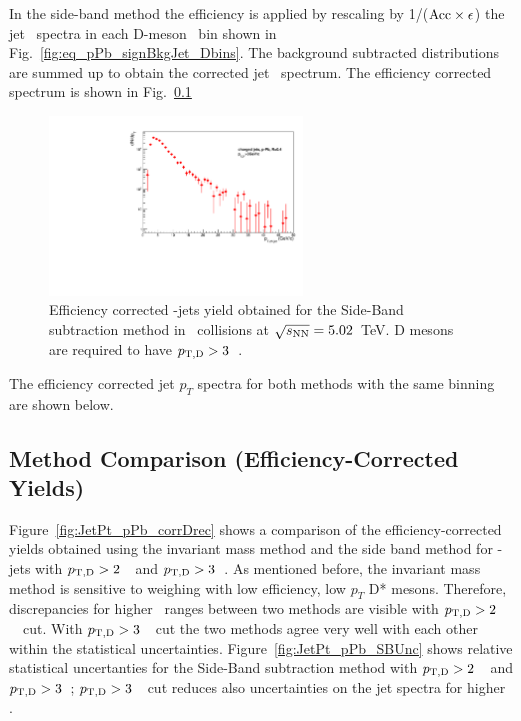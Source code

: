 
In the side-band method the efficiency is applied by rescaling by 1/(${\rm Acc} \times \epsilon$) the jet \pt\ spectra in each D-meson \pt\ bin shown in 
Fig.~\ref{fig:eq_pPb_signBkgJet_Dbins}. 
The background subtracted distributions are summed up to obtain the corrected jet \pt\ spectrum. The efficiency corrected spectrum is shown in Fig.~\ref{}

\begin{figure}[bth]
\centering
\includegraphics[width=0.6\textwidth]{pPbplots/plotsSB_pt3_noDetails/jetPtSpectrum_SB_FASTwoSDD}
\caption{Efficiency corrected \Dstar-jets yield obtained for the Side-Band subtraction method in \pPb\ collisions at $\sqrt{s_{\rm NN}}=5.02$~TeV. D mesons are required to have $p_{\mathrm{T,D}}>3$~\GeVc.}
\label{fig:eq_pPb_InvMass_corrDrec}
\end{figure}

The efficiency corrected jet $p_{T}$ spectra for both methods with the same binning are shown below.

\subsection{Method Comparison (Efficiency-Corrected Yields)}

Figure~\ref{fig:JetPt_pPb_corrDrec} shows a comparison of the efficiency-corrected yields obtained using the invariant mass method and the side band method
for \Dstar-jets with $p_{\mathrm{T,D}}>2$~\GeVc\ and $p_{\mathrm{T,D}}>3$~\GeVc. 
As mentioned before, the invariant mass method is sensitive to weighing with low efficiency, low $p_{T}$ D* mesons. Therefore, discrepancies for higher \ptjet\ ranges between two methods are visible with $p_{\mathrm{T,D}}>2$~\GeVc\ cut. With $p_{\mathrm{T,D}}>3$~\GeVc\ cut the two methods agree very well with each other within the statistical uncertainties.
Figure~\ref{fig:JetPt_pPb_SBUnc} shows relative statistical uncertanties for the Side-Band subtraction method with $p_{\mathrm{T,D}}>2$~\GeVc\ and $p_{\mathrm{T,D}}>3$~\GeVc;
$p_{\mathrm{T,D}}>3$~\GeVc\ cut reduces also uncertainties on the jet spectra for higher \ptjet. 

